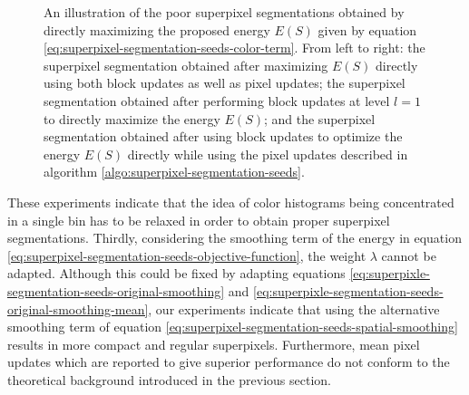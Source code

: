 \begin{figure}[t]
{	}
	\caption[Superpixel segmentations generated by directly maximizing the energy proposed in \cite{VanDenBerghBoixRoigCapitaniVanGool:2012}.]{An illustration of the poor superpixel segmentations obtained by directly maximizing the proposed energy $E(S)$ given by equation \eqref{eq:superpixel-segmentation-seeds-color-term}. From left to right: the superpixel segmentation obtained after maximizing $E(S)$ directly using both block updates as well as pixel updates; the superpixel segmentation obtained after performing block updates at level $l = 1$ to directly maximize the energy $E(S)$; and the superpixel segmentation obtained after using block updates to optimize the energy $E(S)$ directly while using the pixel updates described in algorithm \ref{algo:superpixel-segmentation-seeds}.}
	\label{fig:superpixel-segmentation-seeds-objective-function}
\end{figure}
These experiments indicate that the idea of color histograms being concentrated in a single bin has to be relaxed in order to obtain proper superpixel segmentations. Thirdly, considering the smoothing term of the energy in equation \eqref{eq:superpixel-segmentation-seeds-objective-function}, the weight $\lambda$ cannot be adapted. Although this could be fixed by adapting equations \eqref{eq:superpixle-segmentation-seeds-original-smoothing} and \eqref{eq:superpixle-segmentation-seeds-original-smoothing-mean}, our experiments indicate that using the alternative smoothing term of equation \eqref{eq:superpixel-segmentation-seeds-spatial-smoothing} results in more compact and regular superpixels. Furthermore, mean pixel updates which are reported to give superior performance \cite{VanDenBerghBoixRoigVanGool:2013} do not conform to the theoretical background introduced in the previous section.
